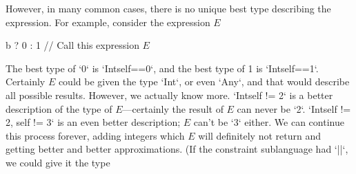 However, in many common cases, there is no unique best type describing the
expression.  For example, consider the expression {$E$} 
\begin{xtenmath}
b ? 0 : 1   // Call this expression $E$
\end{xtenmath}
The
best type of \xcd`0` 
is \xcd`Int{self==0}`, and the best type of 1 is \xcd`Int{self==1}`.
Certainly {$E$} could be given the type \xcd`Int`, or even \xcd`Any`, and that
would describe all possible results.  However, we actually know more.
\xcd`Int{self != 2}` is a better description of the type of {$E$}---certainly
the result of {$E$} can never be \xcd`2`.   \xcd`Int{self != 2, self != 3}` is
an even better description; {$E$} can't be \xcd`3` either.  We can continue
this process forever, adding integers which {$E$} will definitely not return
and getting better and better approximations. (If the constraint
sublanguage had \xcd`||`, we could give it the type 
